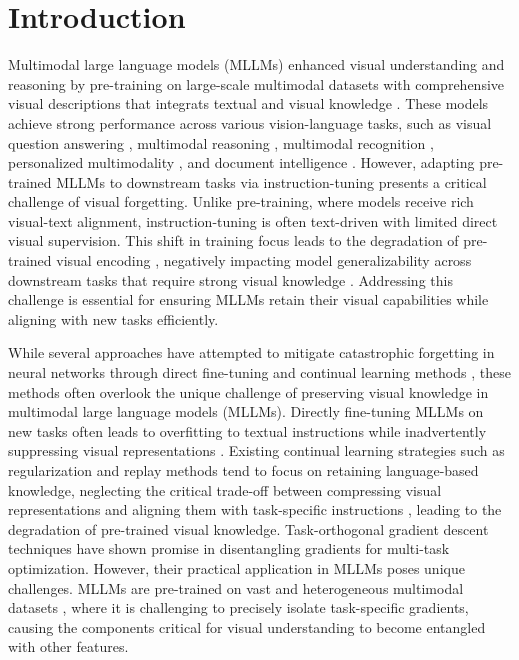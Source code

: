 \section{Introduction}
Multimodal large language models (MLLMs) enhanced visual understanding and reasoning by pre-training on large-scale multimodal datasets with comprehensive visual descriptions that integrats textual and visual knowledge  \cite{liu2024visual,yao2024minicpmvgpt4vlevelmllm,li2023blip,bai2023qwen,liu2024multimodal}. 
These models achieve strong performance across various vision-language tasks, 
such as visual question answering \cite{jin2024rjua}, multimodal reasoning \cite{zhang2024large,jiang2024killing,yan2024list}, multimodal recognition \cite{shenoy2024lumos,wu2024visual}, 
personalized multimodality \cite{wu2024personalized}, and document intelligence \cite{jin2024rjua, shenoy2024lumos}.
However, adapting pre-trained MLLMs to downstream tasks via instruction-tuning  \cite{wu2024commit,li2024vision,li2023fine,panagopoulou2023x,liu2024multimodal} presents a critical challenge of visual forgetting. 
Unlike pre-training, where models receive rich visual-text alignment, instruction-tuning is often text-driven with limited direct visual supervision. 
This shift in training focus leads to the degradation of pre-trained visual encoding \cite{zhou2024mitigating,niu2024text,wu2024commit,ko2023large}, 
negatively impacting model generalizability across downstream tasks that require strong visual knowledge \cite{bai2024hallucination,huang2024visual}. 
Addressing this challenge is essential for ensuring MLLMs retain their visual capabilities while aligning with new tasks efficiently.

While several approaches have attempted to mitigate catastrophic forgetting in neural networks through direct fine-tuning and continual learning methods \cite{shi2024continual, wu2024continual, zhu2024model, zheng2024beyond}, 
these methods often overlook the unique challenge of preserving visual knowledge in multimodal large language models (MLLMs). 
Directly fine-tuning MLLMs on new tasks often leads to overfitting to textual instructions while inadvertently suppressing visual representations \citep{zhai2023investigating}.
Existing continual learning strategies such as regularization and replay methods tend to focus on retaining language-based knowledge, 
neglecting the critical trade-off between compressing visual representations and aligning them with task-specific instructions \cite{zhou2024mitigating, niu2024text, wu2024commit, ko2023large}, 
leading to the degradation of pre-trained visual knowledge.
Task-orthogonal gradient descent techniques have shown promise in disentangling gradients for multi-task optimization.
However, their practical application in MLLMs poses unique challenges. 
MLLMs are pre-trained on vast and heterogeneous multimodal datasets \cite{liu2024visual, li2023blip, bai2023qwen}, 
where it is challenging to precisely isolate task-specific gradients, 
causing the components critical for visual understanding to become entangled with other features.


